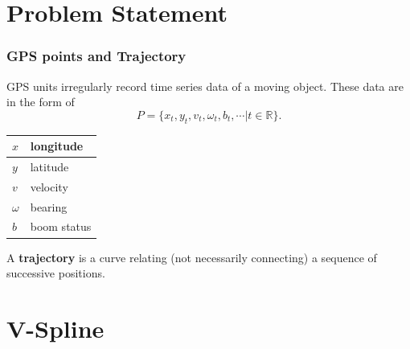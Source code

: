 \documentclass{beamer}
\begin{document}
\section{Problem Statement} 
\begin{frame}
	\frametitle{GPS points and Trajectory}
	
GPS units irregularly record time series data of a moving object. These data are in the form of
\begin{equation}
P=\{x_t,y_t,v_t,\omega_t, b_t, \cdots | t \in \mathbb{R} \}.
\end{equation}
\begin{table}[]
\centering
\begin{tabular}{|l|l|}
\hline
$x$     & longitude   \\ \hline
$y$     & latitude    \\ \hline
$v$      & velocity    \\ \hline
$\omega$ & bearing     \\ \hline
$b$     & boom status \\ \hline
\end{tabular}
\end{table}

A {\bf trajectory} is a curve relating (not necessarily connecting) a sequence of successive positions. 
 

\end{frame}


%
%
%	
%


\section{V-Spline}
\end{document}
